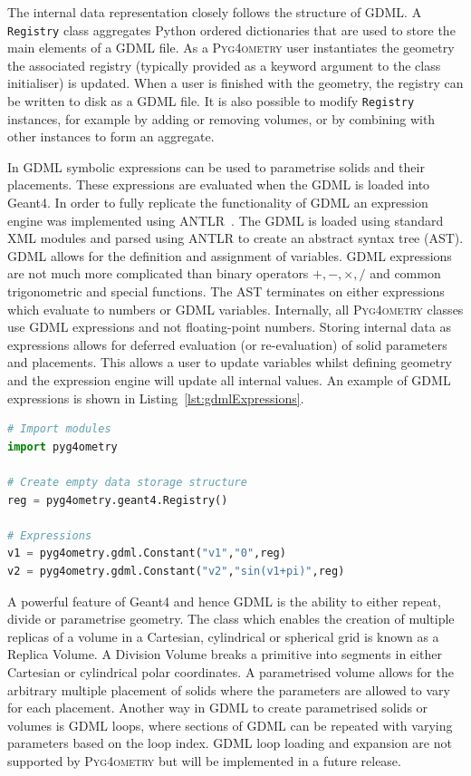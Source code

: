 \documentclass[preprint,12pt]{elsarticle}
\newcommand{\PYGEOMETRY}{\textsc{Pyg4ometry}}
\begin{document}
The internal data representation closely follows the structure of GDML. A \verb|Registry| class aggregates Python ordered dictionaries that are  used to store the main
elements of a GDML file. As a \PYGEOMETRY{} user instantiates the geometry the associated registry (typically provided as a keyword argument to the class initialiser) is updated. When a user is finished with the geometry, the registry
can be written to disk as a GDML file. It is also possible to modify \verb|Registry| instances, for example by adding or removing volumes, or by combining with other instances to form an aggregate.

In GDML symbolic expressions can be used to parametrise solids and their placements. These expressions are evaluated when the GDML is loaded into Geant4.
In order to fully replicate the functionality of GDML an expression engine was implemented using ANTLR~\cite{10.5555/2501720}. The GDML is loaded using
standard XML modules and parsed using ANTLR to create an abstract syntax tree (AST).  GDML allows for the definition
and assignment of variables. GDML expressions are not much more complicated than binary operators $+, -, \times, /$ and common trigonometric and special
functions. The AST terminates on either expressions which evaluate to numbers or GDML variables. Internally, all \PYGEOMETRY{}
classes use GDML expressions and not floating-point numbers. Storing internal data as expressions allows for deferred evaluation (or re-evaluation) of
solid parameters and  placements. This allows a user to update variables whilst defining geometry and the expression engine will update all internal values.
An example of GDML expressions is shown in Listing~\ref{lst:gdmlExpressions}.

\begin{lstlisting}[caption={A simple Python script using \PYGEOMETRY{} to create GDML variables.},label={lst:gdmlExpressions}, language=Python]
# Import modules
import pyg4ometry

# Create empty data storage structure
reg = pyg4ometry.geant4.Registry()

# Expressions
v1 = pyg4ometry.gdml.Constant("v1","0",reg)
v2 = pyg4ometry.gdml.Constant("v2","sin(v1+pi)",reg)

\end{lstlisting}


A powerful feature of Geant4 and hence GDML is the ability to either repeat, divide or parametrise geometry. The class which enables the creation of
multiple replicas of a volume in a Cartesian, cylindrical or spherical grid is known as a Replica Volume. A Division Volume breaks a primitive into segments
in either Cartesian or cylindrical polar coordinates. A parametrised volume allows for the arbitrary multiple placement of solids where the parameters are
allowed to vary for each placement.  Another way in GDML to create parametrised solids or volumes is GDML loops, where sections of GDML can be
 repeated with varying parameters based on the loop index. GDML loop loading and expansion are not supported by \PYGEOMETRY{} but will be implemented in a
future release.
\end{document}
